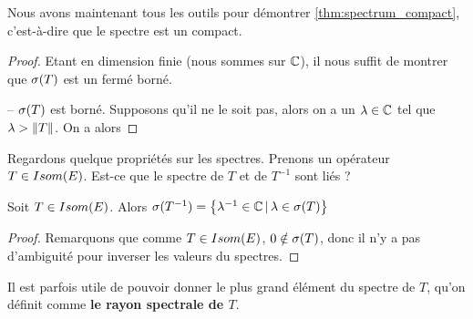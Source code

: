 Nous avons maintenant tous les outils pour démontrer
\ref{thm:spectrum_compact}, c'est-à-dire que le spectre est un compact.

\begin{proof}
	Etant en dimension finie (nous sommes sur $\mathbb{C}$), il nous suffit de
	montrer que $\sigma(T)$ est un fermé borné.

	-- $\sigma(T)$ est borné. Supposons qu'il ne le soit pas, alors on a un
	$\lambda \in \mathbb{C}$ tel que $\lambda > \norm{T}$. On a alors 
\end{proof}


Regardons quelque propriétés sur les spectres. Prenons un opérateur $T \in
Isom(E)$. Est-ce que le spectre de $T$ et de $T^{-1}$ sont liés ?

\begin{proposition}
	Soit $T \in Isom(E)$. Alors $\sigma(T^{-1}) =
	\left\{\lambda^{-1} \in \mathbb{C} \, | \, \lambda \in \sigma(T) \right\}$
\end{proposition}

\begin{proof}
	Remarquons que comme $T \in Isom(E)$, $0 \notin \sigma(T)$,
	donc il n'y a pas d'ambiguité pour inverser les valeurs du spectres.
\end{proof}

Il est parfois utile de pouvoir donner le plus grand élément du spectre de $T$, qu'on
définit comme \textbf{le rayon spectrale de $T$}.




